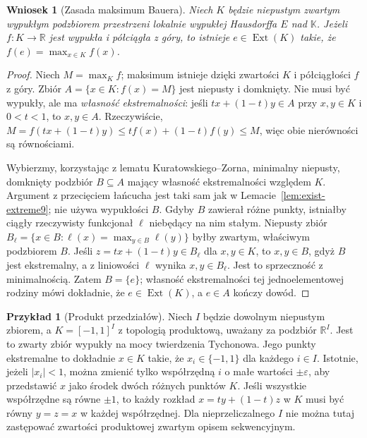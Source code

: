 \documentclass[11pt,a4paper]{article}
\numberwithin{equation}{section}
\theoremstyle{plain}
\newtheorem{wniosek}[twierdzenie]{Wniosek}
\theoremstyle{definition}
\newtheorem{przyklad}[twierdzenie]{Przykład}
\theoremstyle{remark}
\newcommand{\R}{\mathbb R}
\newcommand{\K}{\mathbb K}
\begin{document}
\begin{wniosek}[Zasada maksimum Bauera]
\label{cor:bauer9}
Niech $K$ będzie niepustym zwartym wypukłym podzbiorem
przestrzeni lokalnie wypukłej Hausdorffa $E$ nad $\K$.
Jeżeli $f:K\to\R$ jest wypukła i półciągła z góry,
to istnieje $e\in\operatorname{Ext}(K)$ takie,
że $f(e)=\max_{x\in K}f(x)$.
\end{wniosek}
\begin{proof}
Niech $M=\max_K f$; maksimum istnieje dzięki zwartości $K$
i półciągłości $f$ z góry. Zbiór $A=\{x\in K:f(x)=M\}$
jest niepusty i domknięty. Nie musi być wypukły, ale ma
\emph{własność ekstremalności}: jeśli $tx+(1-t)y\in A$
przy $x,y\in K$ i $0<t<1$, to $x,y\in A$. Rzeczywiście,
$M=f(tx+(1-t)y)\le tf(x)+(1-t)f(y)\le M$,
więc obie nierówności są równościami.

Wybierzmy, korzystając z lematu Kuratowskiego--Zorna,
minimalny niepusty, domknięty podzbiór $B\subseteq A$
mający własność ekstremalności względem $K$.
Argument z przecięciem łańcucha jest taki sam jak
w Lemacie~\ref{lem:exist-extreme9}; nie używa wypukłości $B$.
Gdyby $B$ zawierał różne punkty, istniałby ciągły rzeczywisty
funkcjonał $\ell$ niebędący na nim stałym. Niepusty zbiór
$B_\ell=\{x\in B:\ell(x)=\max_{y\in B}\ell(y)\}$
byłby zwartym, właściwym podzbiorem $B$.
Jeśli $z=tx+(1-t)y\in B_\ell$ dla $x,y\in K$, to
$x,y\in B$, gdyż $B$ jest ekstremalny, a z liniowości
$\ell$ wynika $x,y\in B_\ell$. Jest to sprzeczność
z minimalnością. Zatem $B=\{e\}$; własność ekstremalności
tej jednoelementowej rodziny mówi dokładnie,
że $e\in\operatorname{Ext}(K)$, a $e\in A$ kończy dowód.
\end{proof}

\begin{przyklad}[Produkt przedziałów]
\label{ex:krein-cube9}
Niech $I$ będzie dowolnym niepustym zbiorem,
a $K=[-1,1]^I$ z topologią produktową, uważany za
podzbiór $\R^I$. Jest to zwarty zbiór wypukły na mocy
twierdzenia Tychonowa. Jego punkty ekstremalne to dokładnie
$x\in K$ takie, że $x_i\in\{-1,1\}$ dla każdego $i\in I$.
Istotnie, jeżeli $|x_i|<1$, można zmienić tylko współrzędną
$i$ o małe wartości $\pm\varepsilon$, aby przedstawić
$x$ jako środek dwóch różnych punktów $K$.
Jeśli wszystkie współrzędne są równe $\pm1$, to każdy
rozkład $x=ty+(1-t)z$ w $K$ musi być równy $y=z=x$
w każdej współrzędnej.
Dla nieprzeliczalnego $I$ nie można tutaj zastępować
zwartości produktowej zwartym opisem sekwencyjnym.
\end{przyklad}
\end{document}
